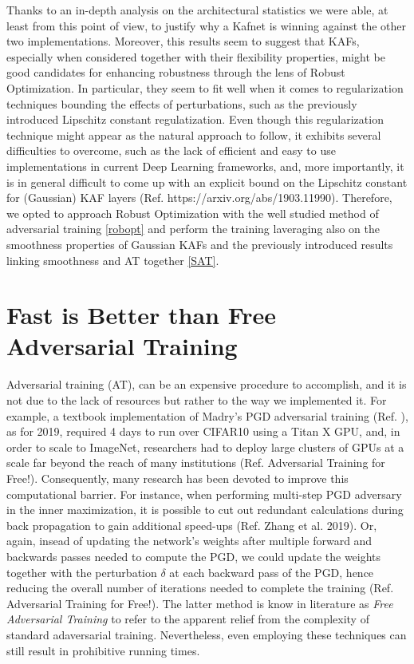 \documentclass[LaM,binding=0.6cm]{./packages/sapthesis/sapthesis}
\begin{document}
        Thanks to an in-depth analysis on the architectural statistics we were able, at least from this point of view, to justify why a Kafnet is winning 
        against the other two implementations. Moreover, this results seem to suggest that KAFs, especially when considered together with their flexibility 
        properties, might be good candidates for enhancing robustness through the lens of Robust Optimization. In particular, they seem to fit well when it 
        comes to regularization techniques bounding the effects of perturbations, such as the previously introduced Lipschitz constant regulatization.
        Even though this regularization technique might appear as the natural approach to follow, it exhibits several difficulties to overcome, such as the lack 
        of efficient and easy to use implementations in current Deep Learning frameworks, and, more importantly, it is in general difficult to come up with an explicit bound 
        on the Lipschitz constant for (Gaussian) KAF layers (Ref. https://arxiv.org/abs/1903.11990). Therefore, we opted to approach Robust Optimization with 
        the well studied method of adversarial training \ref{robopt} and perform the training laveraging also on the smoothness properties of Gaussian KAFs 
        and the previously introduced results linking smoothness and AT together \ref{SAT}.  

    \section{Fast is Better than Free Adversarial Training}
    \label{fbf}
        Adversarial training (AT), can be an expensive procedure to accomplish, and it is not due to the lack of resources but rather to the way we
        implemented it. For example, a textbook implementation of Madry's PGD adversarial training (Ref. ), as for 2019, required 4 days to run over 
        CIFAR10 using a Titan X GPU, and, in order to scale to ImageNet, researchers had to deploy large clusters of GPUs at a scale far beyond the reach of many 
        institutions (Ref. Adversarial Training for Free!). Consequently, many research has been devoted to improve this computational barrier. For 
        instance, when performing multi-step PGD adversary in the inner maximization, it is possible to cut out redundant calculations during back 
        propagation to gain additional speed-ups (Ref. Zhang et al. 2019). Or, again, insead of updating the network's weights after multiple 
        forward and backwards passes needed to compute the PGD, we could update the weights together with the perturbation $\delta$ at each 
        backward pass of the PGD, hence reducing the overall number of iterations needed to complete the training (Ref. Adversarial Training for Free!).
        The latter method is know in literature as \textit{Free Adversarial Training} to refer to the apparent relief from the complexity of standard adaversarial
        training.
        Nevertheless, even employing these techniques can still result in prohibitive running times.
        
\end{document}
